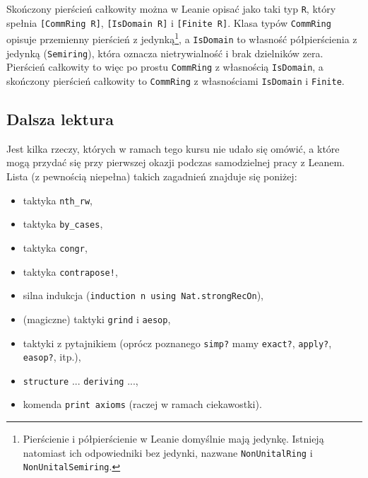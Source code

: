 \documentclass[polish,pretty,bibliography=totocnumbered]{angav}
\newcommand{\Lean}[1]{\texttt{#1}}
\begin{document}
Skończony pierścień całkowity można w Leanie opisać jako taki typ \Lean{R}, który spełnia \Lean{[CommRing R]}, \Lean{[IsDomain R]} i \Lean{[Finite R]}.
Klasa typów \Lean{CommRing} opisuje przemienny pierścień z jedynką\footnote{Pierścienie i półpierścienie w Leanie domyślnie mają jedynkę. Istnieją natomiast ich odpowiedniki bez jedynki, nazwane \texttt{NonUnitalRing} i \texttt{NonUnitalSemiring}.}, a \Lean{IsDomain} to własność półpierścienia z jedynką (\Lean{Semiring}), która oznacza nietrywialność i brak dzielników zera. Pierścień całkowity to więc po prostu \Lean{CommRing} z własnością \Lean{IsDomain}, a skończony pierścień całkowity to \Lean{CommRing} z własnościami \Lean{IsDomain} i \Lean{Finite}.

\subsection{Dalsza lektura}

Jest kilka rzeczy, których w ramach tego kursu nie udało się omówić, a które mogą przydać się przy pierwszej okazji podczas samodzielnej pracy z Leanem. Lista (z pewnością niepełna) takich zagadnień znajduje się poniżej:
\begin{itemize}
    \item taktyka \Lean{nth_rw},
    \item taktyka \Lean{by_cases},
    \item taktyka \Lean{congr},
    \item taktyka \Lean{contrapose!},
    \item silna indukcja (\Lean{induction n using Nat.strongRecOn}),
    \item (magiczne) taktyki \Lean{grind} i \Lean{aesop},
    \item taktyki z pytajnikiem (oprócz poznanego \Lean{simp?} mamy \Lean{exact?}, \Lean{apply?}, \Lean{easop?}, itp.),
    \item \Lean{structure} ... \Lean{deriving} ...,
    \item komenda \Lean{print axioms} (raczej w ramach ciekawostki).
\end{itemize}
\end{document}
